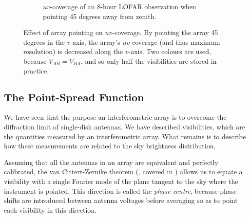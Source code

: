 \begin{figure}[ht]
\begin{subfigure}{.40\textwidth}
\caption{\label{fig.lofar.uvcoverage.elsewhere} $uv$-coverage of an 8-hour LOFAR observation when pointing 45 degrees away from zenith.}
\end{subfigure}
\caption{\label{fig.uvcoverage.lofar} Effect of array pointing on $uv$-coverage. By pointing the array 45 degrees in the $v$-axis, the array's $uv$-coverage (and thus maximum resolution) is decreased along the $v$-axis. Two colours are used, because $V_{AB}=V_{BA}$, and so only half the visibilities are stored in practice.}
\end{figure}


\subsection{The Point-Spread Function}\label{sec.imag.psf}

\pg
We have seen that the purpose an interferometric array is to overcome the diffraction limit of single-dish antennas. We have described visibilities, which are the quantities measured by an interferometric array. What remains is to describe how these measurements are related to the sky brightness distribution.

\pg
Assuming that all the antennas in an array are equivalent and perfectly calibrated, the van Cittert-Zernike theorem (, covered in ) allows us to equate a visibility with a single Fourier mode of the plane tangent to the sky where the instrument is pointed. This direction is called the \emph{phase centre}, because phase shifts are introduced between antenna voltages before averaging so as to point each visibility in this direction. 

